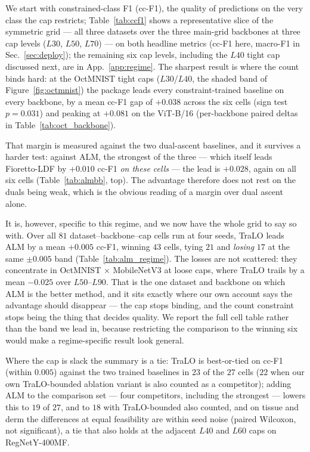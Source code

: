 \documentclass[10pt]{article}
\begin{document}
We start with constrained-class F1 (cc-F1), the quality of predictions on
the very class the cap restricts; Table~\ref{tab:ccf1} shows %
{a representative slice of the symmetric grid --- all three datasets
over the three main-grid backbones at three cap levels ($L30$, $L50$, $L70$) ---}
on both
headline metrics (cc-F1 here, macro-F1 in Sec.~\ref{sec:deploy}){;
the remaining six cap levels, including the $L40$ tight cap discussed next, are
in App.~\ref{app:regime}}. The
sharpest result is where the count binds hard: at the OctMNIST tight caps
($L30$/$L40$, the shaded band of Figure~\ref{fig:octmnist}) the package
leads %
{every constraint-trained baseline} on every backbone, by a mean
cc-F1 gap of $+0.038$ across the six cells (sign test $p{=}0.031$) and
peaking at $+0.081$ on the ViT-B/16 (per-backbone paired deltas in
Table~\ref{tab:oct_backbone}).
{That margin is measured against the two dual-ascent baselines, and
it survives a harder test: against ALM, the strongest of the three --- which
itself leads Fioretto-LDF by $+0.010$ cc-F1 \emph{on these cells} --- the lead is
$+0.028$, again on
all six cells (Table~\ref{tab:almbb}, top). The advantage therefore does not rest
on the duals being weak, which is the obvious reading of a margin over dual ascent
alone.

It is, however, specific to this regime, and we now have the whole grid to say so
with. Over all $81$ dataset--backbone--cap cells run at four seeds, TraLO leads
ALM by a mean $+0.005$ cc-F1, winning $43$ cells, tying $21$ and \emph{losing}
$17$ at the same $\pm0.005$ band (Table~\ref{tab:alm_regime}). The losses are not
scattered: they concentrate in OctMNIST $\times$ MobileNetV3 at loose caps, where
TraLO trails by a mean $-0.025$ over $L50$--$L90$. That is the one dataset and
backbone on which ALM is the better method, and it sits exactly where our own
account says the advantage should disappear --- the cap stops binding, and the
count constraint stops being the thing that decides quality. We report the full
cell table rather than the band we lead in, because restricting the comparison to
the winning six would make a regime-specific result look general.}
Where the cap is slack the summary is a tie:
TraLO is best-or-tied on cc-F1 (within $0.005$) against the two trained
baselines in $23$ of the $27$ cells ($22$ when our own TraLO-bounded
ablation variant is also counted as a competitor){; adding ALM to the
comparison set --- four competitors, including the strongest --- lowers this to
$19$ of $27$, and to $18$ with TraLO-bounded also counted}, and on tissue and derm
the differences at equal feasibility are within seed noise (paired
Wilcoxon, not significant), a tie that also holds {at the adjacent $L40$ and
$L60$ caps} on RegNet{Y-400MF}.
\end{document}
